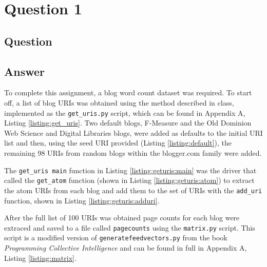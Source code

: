 \section{Question 1}

\subsection{Question}


\subsection{Answer}
To complete this assignment, a blog word count dataset was required. To start off, a list of blog URIs was obtained using the method described in class, implemented as the {\tt get\_uris.py} script, which can be found in Appendix A, Listing \ref{listing:get_uris}. Two default blogs, F-Measure and the Old Dominion Web Science and Digital Libraries blogs, were added as defaults to the initial URI list and then, using the seed URI provided (Listing \ref{listing:default}), the remaining 98 URIs from random blogs within the blogger.com family were added.





The {\tt get\_uris main} function in Listing \ref{listing:geturis:main} was the driver that called the {\tt get\_atom} function (shown in Listing \ref{listing:geturis:atom}) to extract the atom \cite{atom} URIs from each blog and add them to the set of URIs with the {\tt add\_uri} function, shown in Listing \ref{listing:geturis:adduri}.

\clearpage





After the full list of 100 URIs was obtained page counts for each blog were extraced and saved to a file called {\tt pagecounts} using the {\tt matrix.py} script. This script is a modified version of {\tt generatefeedvectors.py} from the book {\it Programming Collective Intelligence} \cite{pci} and can be found in full in Appendix A, Listing \ref{listing:matrix}. 

